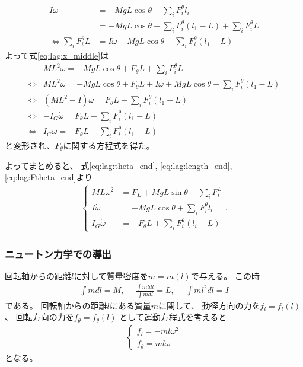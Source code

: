 \documentclass[a4paper,11pt]{jsarticle}
\begin{document}
\begin{align}
  I\dot\omega 
  &= -MgL\cos\theta + \sum_i F_i^\theta l_i
  \\
  &= -MgL\cos\theta + \sum_i F_i^\theta (l_1 - L) + \sum_i F_i^\theta L
  \\
  \Leftrightarrow
  \sum_i F_i^\theta L
  &= I\dot\omega + MgL\cos\theta - \sum_i F_i^\theta (l_1 - L)
\end{align}
よって式\ref{eq:lag:x_middle}は
\begin{align}
  & M L^2 \dot\omega = - Mg L \cos\theta + F_\theta L + \sum_i F_i^\theta L
  \\
  \Leftrightarrow
  & M L^2 \dot\omega = - Mg L \cos\theta + F_\theta L + I\dot\omega + MgL\cos\theta - \sum_i F_i^\theta (l_1 - L)
  \\
  \Leftrightarrow
  & ( M L^2 - I ) \dot\omega = F_\theta L - \sum_i F_i^\theta (l_1 - L)
  \\
  \Leftrightarrow
  & -I_G \dot\omega = F_\theta L - \sum_i F_i^\theta (l_1 - L)
  \\
  \Leftrightarrow
  & I_G \dot\omega = - F_\theta L + \sum_i F_i^\theta (l_1 - L)
  \label{eq:lag:Ftheta_end}
\end{align}
と変形され、$F_\theta$に関する方程式を得た。

よってまとめると、
式\ref{eq:lag:theta_end}, \ref{eq:lag:length_end}, \ref{eq:lag:Ftheta_end}より
\begin{align}
  \begin{cases}
    ML\omega^2 &= F_L + MgL\sin\theta - \sum_i F_i^L
    \\
    I\dot\omega &= -MgL\cos\theta + \sum_i F_i^\theta l_i
    \\
    I_G\dot\omega &= -F_\theta L + \sum_i F_i^\theta ( l_i - L )
  \end{cases}.
\end{align}

\clearpage
\subsubsection{ニュートン力学での導出}
\label{subsubsec:newton}

回転軸からの距離$l$に対して質量密度を$m=m(l)$で与える。
この時
\begin{align}
  \int m dl = M, \ \ \ \ \ \
  \frac{\int ml dl}{\int m dl} = L, \ \ \ \ \ \
  \int ml^2 dl = I
\end{align}
である。
回転軸からの距離$l$にある質量$m$に関して、
動径方向の力を$f_l=f_l(l)$、
回転方向の力を$f_\theta=f_\theta(l)$
として運動方程式を考えると
\begin{align}
  \begin{cases}
    f_l = -ml\omega^2
    \\
    f_\theta = ml\dot\omega
  \end{cases}
\end{align}
となる。
\end{document}
